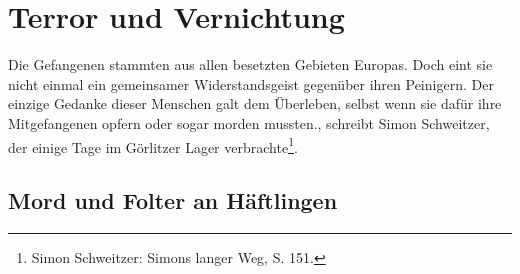 \documentclass[a4paper,12pt,ngerman,
]{nisebook}
\begin{document}
\section{Terror und Vernichtung}
\begin{leftbar}
Die Gefangenen stammten aus allen besetzten Gebieten Europas. Doch eint sie nicht einmal ein gemeinsamer Widerstandsgeist gegenüber ihren Peinigern. Der einzige Gedanke dieser Menschen galt dem Überleben, selbst wenn sie dafür ihre Mitgefangenen opfern oder sogar morden mussten.\grqq, schreibt Simon Schweitzer, der einige Tage im Görlitzer Lager verbrachte\footnote{Simon Schweitzer: Simons langer Weg, S. 151.}.
\end{leftbar}


\subsection{Mord und Folter an Häftlingen}
\end{document}
